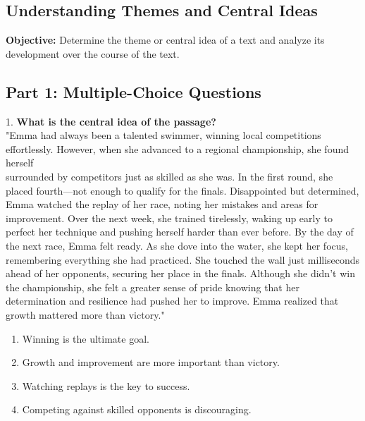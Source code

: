 \documentclass[12pt]{article}
\begin{document}
\subsection*{Understanding Themes and Central Ideas}
\onehalfspacing

\begin{tcolorbox}[colframe=black!40, colback=gray!0, title=Learning Objective]
\textbf{Objective:} Determine the theme or central idea of a text and analyze its development over the course of the text.
\end{tcolorbox}

\subsection*{Part 1: Multiple-Choice Questions}

1. \textbf{What is the central idea of the passage?\\}
"Emma had always been a talented swimmer, winning local competitions effortlessly. However, when she advanced to a regional championship, she found herself \\surrounded by competitors just as skilled as she was. In the first round, she placed fourth—not enough to qualify for the finals. Disappointed but determined, Emma watched the replay of her race, noting her mistakes and areas for improvement. Over the next week, she trained tirelessly, waking up early to perfect her technique and pushing herself harder than ever before. By the day of the next race, Emma felt ready. As she dove into the water, she kept her focus, remembering everything she had practiced. She touched the wall just milliseconds ahead of her opponents, securing her place in the finals. Although she didn’t win the championship, she felt a greater sense of pride knowing that her determination and resilience had pushed her to improve. Emma realized that growth mattered more than victory."  
\begin{enumerate}[label=\Alph*.]
    \item Winning is the ultimate goal.  
    \item Growth and improvement are more important than victory.  
    \item Watching replays is the key to success.  
    \item Competing against skilled opponents is discouraging.  
\end{enumerate}
\end{document}
